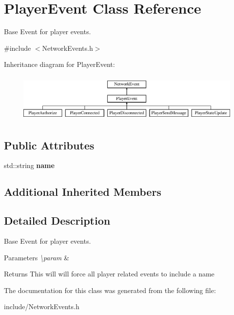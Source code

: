 \hypertarget{class_player_event}{\section{Player\-Event Class Reference}
\label{class_player_event}
}


Base Event for player events.  




{\ttfamily \#include $<$Network\-Events.\-h$>$}

Inheritance diagram for Player\-Event\-:\begin{figure}[H]
\begin{center}
\leavevmode
\includegraphics[height=2.452555cm]{class_player_event}
\end{center}
\end{figure}
\subsection*{Public Attributes}
\begin{DoxyCompactItemize}
\item 
\hypertarget{class_player_event_ae3866ad1c76d10e4826bf8599d19a44a}{std\-::string {\bfseries name}}\label{class_player_event_ae3866ad1c76d10e4826bf8599d19a44a}

\end{DoxyCompactItemize}
\subsection*{Additional Inherited Members}


\subsection{Detailed Description}
Base Event for player events. 


\begin{DoxyParams}{Parameters}
{\em \textbackslash{}param} & \\
\hline
\end{DoxyParams}
\begin{DoxyReturn}{Returns}
This will will force all player related events to include a name 
\end{DoxyReturn}


The documentation for this class was generated from the following file\-:\begin{DoxyCompactItemize}
\item 
include/Network\-Events.\-h\end{DoxyCompactItemize}
